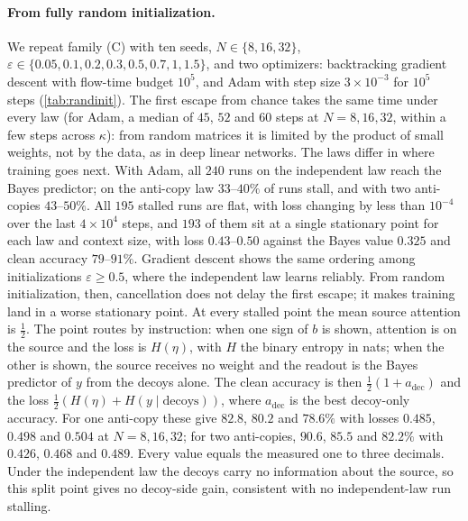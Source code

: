 \paragraph{From fully random initialization.}
We repeat family (C) with ten seeds, $N\in\{8,16,32\}$, $\varepsilon\in\{0.05,0.1,0.2,0.3,0.5,0.7,1,1.5\}$, and two optimizers: backtracking gradient descent with
flow-time budget $10^5$, and Adam with step size $3\times10^{-3}$ for $10^5$ steps (\cref{tab:randinit}).
The first escape from chance takes the same time under every law (for Adam, a median of $45$, $52$ and $60$ steps at $N=8,16,32$, within a few steps across $\kappa$):
from random matrices it is limited by the product of small weights, not by the data, as in deep linear networks.
The laws differ in where training goes next. With Adam, all $240$ runs on the independent law reach the Bayes predictor; on the anti-copy law $33$--$40\%$ of runs
stall, and with two anti-copies $43$--$50\%$. All $195$ stalled runs are flat, with loss changing by less than $10^{-4}$ over the last $4\times10^4$ steps, and $193$ of them sit at a single stationary point
for each law and context size, with loss $0.43$--$0.50$ against the Bayes value $0.325$ and clean accuracy $79$--$91\%$. Gradient descent shows the same ordering among initializations $\varepsilon\ge0.5$, where the
independent law learns reliably. From random initialization, then, cancellation does not delay the first escape; it makes training land in a worse stationary point.
At every stalled point the mean source attention is $\tfrac12$. The point routes by instruction: when one sign of $b$ is shown, attention is on the source and the
loss is $H(\eta)$, with $H$ the binary entropy in nats; when the other is shown, the source receives no weight and the readout is the Bayes predictor of $y$ from the decoys alone. The clean accuracy is then
$\tfrac12(1+a_{\mathrm{dec}})$ and the loss $\tfrac12(H(\eta)+H(y\mid\text{decoys}))$, where $a_{\mathrm{dec}}$ is the best decoy-only accuracy. For one anti-copy these give $82.8$, $80.2$ and
$78.6\%$ with losses $0.485$, $0.498$ and $0.504$ at $N=8,16,32$; for two anti-copies, $90.6$, $85.5$ and $82.2\%$ with $0.426$, $0.468$ and $0.489$. Every
value equals the measured one to three decimals. Under the independent law the decoys carry no information about the source, so this split point gives no decoy-side
gain, consistent with no independent-law run stalling.

